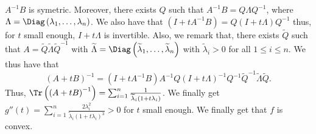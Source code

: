 \documentclass{article}
\begin{document}
\begin{itemize}
           $A^{-1}B$ is symetric.
           Moreover, there exists
           $Q$ such that $A^{-1}B = Q \Lambda Q^{-1}$,
           where $\Lambda = \Diag\left(
           \lambda_{1}, \ldots,
           \lambda_{n}\right)$. 
           We also have that        
           $\left(I + t A^{-1}B\right) = 
           Q \left(I + t \Lambda\right)Q^{-1}$
           thus, for $t$ small
           enough, $I + t \Lambda$
           is invertible.
           Also, we remark that, 
           there exists
           $\widetilde{Q}$ such that
           $A = \widetilde{Q} \widetilde{\Lambda} \widetilde{Q}^{-1}$ 
           with $\widetilde{\Lambda} = 
           \Diag\left(\widetilde{\lambda}_{1},
           \ldots, \widetilde{\lambda}_{n}\right)$
           with $\widetilde{\lambda}_{i} > 0$ 
           for all $1 \leq i \leq n$.
           We thus have that 
           \begin{equation*}
               \left(A + tB\right)^{-1} = 
               \left(I + tA^{-1}B\right)A^{-1}
               Q \left(I  + t\Lambda\right)^{-1}Q^{-1}
               \widetilde{Q}^{-1} \widetilde{\Lambda} \widetilde{Q}.
           \end{equation*}
           Thus, $\Tr\left(\left(A + tB\right)^{-1}\right) = 
           \sum _{i = 1}^{n} \frac{1}{\widetilde{\lambda}_{i}
           \left(1 + t \lambda_{i}\right)}$. 
           We finally get
           $g''\left(t\right) = \sum_{i = 1}^{n}
           \frac{2\lambda_{i}^{2}}{\widetilde{\lambda}_{i}
           \left(1 + t \lambda_{i}\right)^{3}} > 0$ 
           for $t$ small enough.
           We finally get that
           $f$ is convex.
   \end{itemize}
\end{document}
